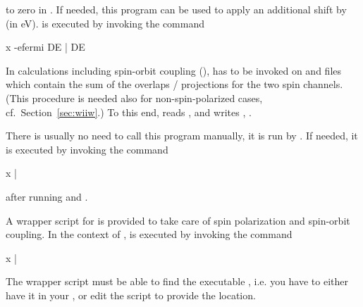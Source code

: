 



to zero in .  If needed, this program can be used to
apply an additional shift by  (in eV).   is
executed by invoking the command
%
\begin{usage}
  x \shifteig [-up|-dn] -efermi DE |
  \shifteig {} DE
\end{usage}



In calculations including spin-orbit coupling (\soc), \wannier has to
be invoked on  and  files which
contain the sum of the overlaps / projections for the two spin
channels.  (This procedure is needed also for non-spin-polarized
cases, cf.~Section~\ref{sec:wiiw}.)  To this end, 
reads ,  and writes
, .

There is usually no need to call this program manually, it is run by
.  If needed, it is executed by invoking the
command
%
\begin{usage}
  x \wiiwaddsp |
  \wiiwaddsp {}
\end{usage}
%
after running  and .



A wrapper script for \wannierx is provided to take care of spin
polarization and spin-orbit coupling.  In the context of \wtow,
\wannierx is executed by invoking the command
%
\begin{usage}
  x \xwannier [-up|-dn|-so|-pp] |
  \xwannier [-up|-dn|-so|-pp]
\end{usage}
%
The wrapper script must be able to find the executable \wannierx,
i.e. you have to either have it in your , or edit the
script  to provide the location.

